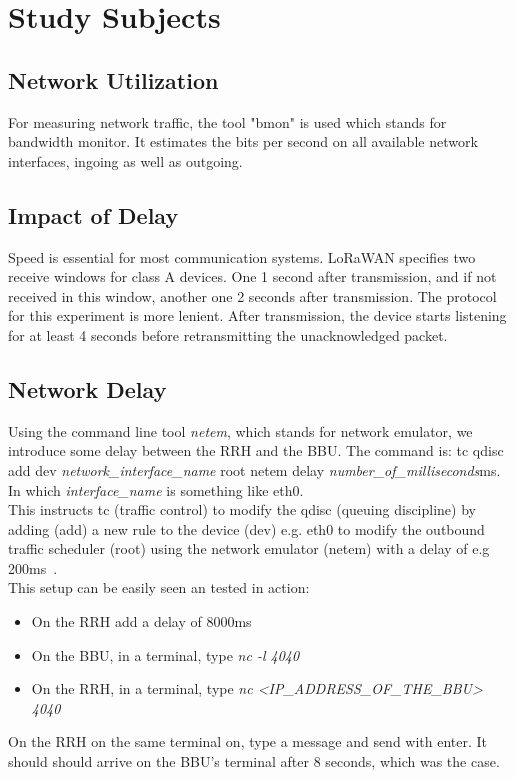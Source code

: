 \section{Study Subjects}
\subsection{Network Utilization}
For measuring network traffic, the tool "bmon" is used which stands for bandwidth monitor.
It estimates the bits per second on all available network interfaces, ingoing as well as outgoing. 
\subsection{Impact of Delay}
Speed is essential for most communication systems.
LoRaWAN specifies two receive windows for class A devices. One 1 second after transmission, and if not
received in this window, another one 2 seconds after transmission.
The protocol for this experiment is more lenient. After transmission, the device starts listening
for at least 4 seconds before retransmitting the unacknowledged packet.
\subsection{Network Delay}
Using the command line tool \emph{netem}, which stands for network emulator, we introduce some delay between the RRH and the BBU.
The command is: tc qdisc add dev \emph{network\_interface\_name} root netem delay \emph{number\_of\_milliseconds}ms. In which \emph{interface\_name} is something like 
eth0. 
\\
This instructs tc (traffic control) to modify the qdisc (queuing discipline) by 
adding (add) a new rule to the device (dev) e.g. eth0 to modify the outbound traffic scheduler (root) using 
the network emulator (netem) with a delay of e.g 200ms~\cite{netem}.
\\
This setup can be easily seen an tested in action:
\begin{itemize}
    \item On the RRH add a delay of 8000ms
    \item On the BBU, in a terminal, type \emph{nc -l 4040}
    \item On the RRH, in a terminal, type \emph{nc <\emph{IP\_ADDRESS\_OF\_THE\_BBU}> 4040}
\end{itemize}

On the RRH on the same terminal on, type a message and send with enter. It should should arrive on the BBU's terminal 
after 8 seconds, which was the case. 

